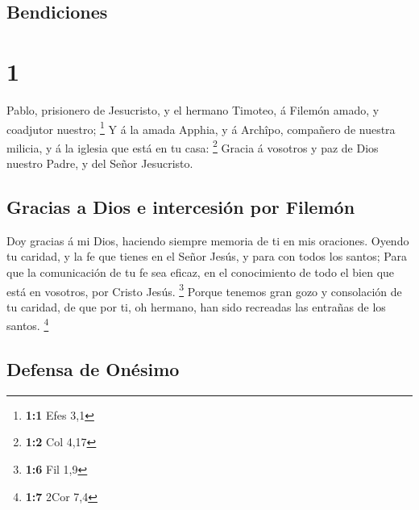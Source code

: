 \hypertarget{bendiciones}{%
\subsection{Bendiciones}\label{bendiciones}}

\hypertarget{section}{%
\section{1}\label{section}}

 Pablo, prisionero de Jesucristo, y el hermano Timoteo, á
Filemón amado, y coadjutor nuestro; \footnote{\textbf{1:1} Efes 3,1}
 Y á la amada Apphia, y á Archîpo, compañero de nuestra
milicia, y á la iglesia que está en tu casa: \footnote{\textbf{1:2} Col
  4,17}  Gracia á vosotros y paz de Dios nuestro Padre, y
del Señor Jesucristo.

\hypertarget{gracias-a-dios-e-intercesiuxf3n-por-filemuxf3n}{%
\subsection{Gracias a Dios e intercesión por
Filemón}\label{gracias-a-dios-e-intercesiuxf3n-por-filemuxf3n}}

 Doy gracias á mi Dios, haciendo siempre memoria de ti en
mis oraciones.  Oyendo tu caridad, y la fe que tienes en
el Señor Jesús, y para con todos los santos;  Para que la
comunicación de tu fe sea eficaz, en el conocimiento de todo el bien que
está en vosotros, por Cristo Jesús. \footnote{\textbf{1:6} Fil 1,9}
 Porque tenemos gran gozo y consolación de tu caridad, de
que por ti, oh hermano, han sido recreadas las entrañas de los santos.
\footnote{\textbf{1:7} 2Cor 7,4}

\hypertarget{defensa-de-onuxe9simo}{%
\subsection{Defensa de Onésimo}\label{defensa-de-onuxe9simo}}

